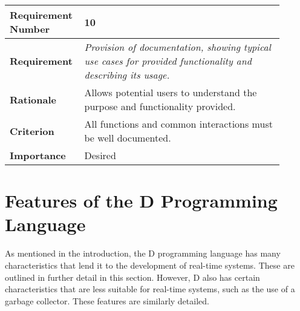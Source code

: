 \begin{table}[!h]
\centering
\begin{tabular}{|L{0.2\linewidth}|L{0.7\linewidth}|}
\hline
\textbf{Requirement Number} & 10 \\ \hline
\textbf{Requirement} & \emph{Provision of documentation, showing typical use cases for provided 
                functionality and describing its usage.} \\ \hline
\textbf{Rationale}      & Allows potential users to understand the purpose and 
                functionality provided. \\ \hline
\textbf{Criterion}      & All functions and common interactions must be well documented. \\ \hline
\textbf{Importance}     & Desired \\ \hline
\end{tabular}
\end{table}
\FloatBarrier
\section{Features of the D Programming Language}
As mentioned in the introduction, the D programming language has many 
characteristics that lend it to the development of real-time systems.
These are outlined in further detail in this section. 
However, D also has certain characteristics that are less suitable for 
real-time systems, such as the use of a garbage collector. 
These features are similarly detailed.

